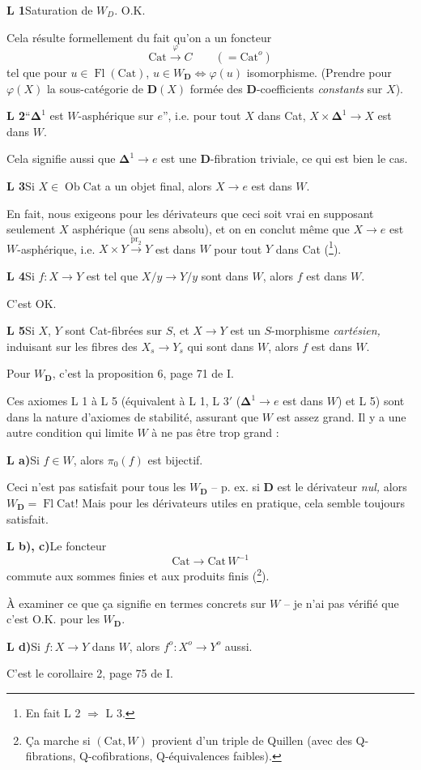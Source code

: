 \documentclass[11pt]{article}
\newcommand{\printedpage}[1]{\marginpar{\footnotesize p.~#1}}
\newcommand{\msp}[1]{\marginpar{\footnotesize [#1]}}
\newcommand{\D}{\mathbf{D}}
\newcommand{\Cat}{\mathrm{Cat}}
\newcommand{\Fl}{\operatorname{Fl}}
\newcommand{\Ob}{\operatorname{Ob}}
\newcommand{\bDelta}{\boldsymbol{\Delta}}
\begin{document}
\textbf{L 1}\enspace Saturation de $W_D$. O.K.

Cela résulte formellement du fait qu’on a un foncteur
\[
\Cat \xrightarrow{\varphi} C \qquad (= \Cat^o)
\]
tel que pour $u \in \Fl(\Cat)$, $u \in W_{\D} \iff \varphi(u)$ isomorphisme. (Prendre pour $\varphi(X)$ la sous-catégorie de $\D(X)$ formée des $\D$-coefficients \textit{constants} sur $X$).

\textbf{L 2}\enspace “$\bDelta^1$ est $W$-asphérique sur $e$”, i.e. pour tout $X$ dans Cat, $X \times \bDelta^1 \longrightarrow X$ est dans $W$.

Cela signifie aussi que $\bDelta^1 \longrightarrow e$ est une $\D$-fibration triviale, ce qui est bien le cas.

\clearpage

\printedpage{3}

\textbf{L 3}\enspace Si $X \in \Ob\Cat$ a un objet final, alors $X \longrightarrow e$ est dans $W$.

En fait, nous exigeons pour les dérivateurs que ceci soit vrai en supposant seulement $X$ asphérique (au sens absolu), et on en conclut même que $X \longrightarrow e$ est $W$-asphérique, i.e. $X \times Y \xrightarrow{\mathrm{pr}_2} Y$ est dans $W$ pour tout $Y$ dans Cat (\footnote{En fait L 2 $\Longrightarrow$ L 3.}).

\textbf{L 4}\enspace Si $f : X \longrightarrow Y$ est tel que $X/y \longrightarrow Y/y$ sont dans $W$, alors $f$ est dans $W$.

C’est OK.

\msp{page 5}
\textbf{L 5}\enspace Si $X$, $Y$ sont Cat-fibrées sur $S$, et $X \longrightarrow Y$ est un $S$-morphisme \textit{cartésien,} induisant sur les fibres des $X_s \longrightarrow Y_s$ qui sont dans $W$, alors $f$ est dans $W$.

Pour $W_{\D}$, c’est la proposition 6, page 71 de I.

Ces axiomes L 1 à L 5 (équivalent à L 1, L 3$'$ ($\bDelta^1 \longrightarrow e$ est dans $W$) et L 5) sont dans la nature d’axiomes de stabilité, assurant que $W$ est assez grand. Il y a une autre condition qui limite $W$ à ne pas être trop grand :

\textbf{L a)}\enspace Si $f \in W$, alors $\pi_0(f)$ est bijectif.

Ceci n’est pas satisfait pour tous les $W_{\D}$ – p. ex. si $\D$ est le dérivateur \textit{nul,} alors $W_{\D} = \Fl\Cat$! Mais pour les dérivateurs utiles en pratique, cela semble toujours satisfait.

\textbf{L b), c)}\enspace Le foncteur
\[
\Cat \longrightarrow \Cat\, W^{-1}
\]
commute aux sommes finies et aux produits finis (\footnote{Ça marche si $(\Cat, W)$ provient d’un triple de Quillen (avec des Q-fibrations, Q-cofibrations, Q-équivalences faibles).}).

À examiner ce que ça signifie en termes concrets sur $W$ – je n’ai pas vérifié que c’est O.K. pour les $W_{\D}$.

\textbf{L d)}\enspace Si $f : X \longrightarrow Y$ dans $W$, alors $f^o : X^o \longrightarrow Y^o$ aussi.

C’est le corollaire 2, page 75 de I.
\end{document}
